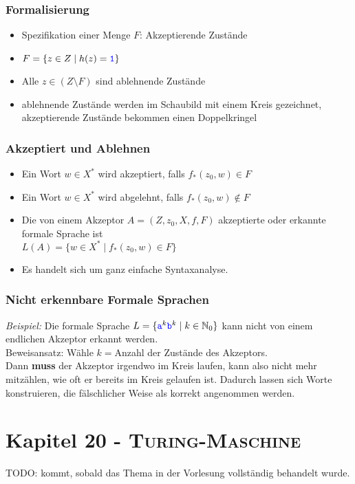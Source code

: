 \documentclass{article}
\newcommand{\Nz}{{\mathbb{N}_0}} %
\newcommand{\kapitel}[2]{Kapitel #1 - \textsc{#2}}
\newcommand{\blue}[1]{\textcolor{blue}{#1}}
\newcommand{\important}[1]{\textcolor{importantColor}{#1}}
\newcommand{\example}[1]{\textit{Beispiel: }#1}
\newcommand{\word}[1]{\blue{\texttt{#1}}}
\newcommand{\set}[1]{\{#1\}}
\newcommand{\anfuehrung}[1]{\flqq #1\frqq}
\begin{document}
\subsubsection{Formalisierung}
\begin{itemize}
    \item Spezifikation einer Menge $F$: \important{Akzeptierende Zustände}
    \item $F=\set{z\in Z\mid h(z)=\word{1}}$
    \item Alle $z\in (Z\setminus F)$ sind \important{ablehnende Zustände}
    \item ablehnende Zustände werden im Schaubild mit einem Kreis gezeichnet, akzeptierende Zustände bekommen einen \anfuehrung{Doppelkringel}
\end{itemize}

\subsubsection{Akzeptiert und Ablehnen}
\begin{itemize}
    \item Ein Wort $w\in X^*$ wird \important{akzeptiert}, falls $f_*(z_0, w)\in F$
    \item Ein Wort $w\in X^*$ wird \important{abgelehnt}, falls $f_*(z_0, w)\notin F$
    \item Die von einem Akzeptor $A=(Z,z_0,X,f,F)$ \important{akzeptierte} oder \important{erkannte formale Sprache} ist\\
    $L(A)=\set{w\in X^*\mid f_*(z_0,w)\in F}$
    \item Es handelt sich um ganz einfache Syntaxanalyse.
\end{itemize}

\subsubsection{Nicht erkennbare Formale Sprachen}
\example{Die formale Sprache $L=\set{\word{a}^k\word{b}^k \mid k\in\Nz}$ kann nicht von einem endlichen Akzeptor erkannt werden.}\\
Beweisansatz: Wähle $k=$Anzahl der Zustände des Akzeptors.\\
Dann \textbf{muss} der Akzeptor irgendwo \anfuehrung{im Kreis laufen}, kann also nicht mehr mitzählen, wie oft er bereits im Kreis gelaufen ist. Dadurch lassen sich Worte konstruieren, die fälschlicher Weise als korrekt angenommen werden.

\newpage
\section{\kapitel{20}{Turing-Maschine}}
TODO: kommt, sobald das Thema in der Vorlesung vollständig behandelt wurde.
\end{document}
